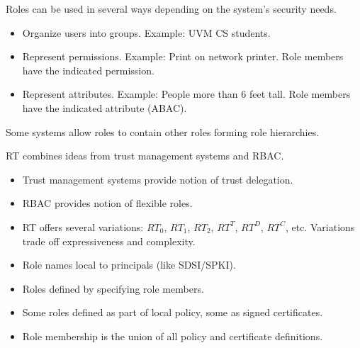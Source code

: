 \documentclass[landscape]{slides}
\begin{document}
\stopslide



Roles can be used in several ways depending on the system's security needs.

\begin{itemize}

\item Organize users into groups. Example: UVM CS students.

\item Represent permissions. Example: Print on network printer. Role members have the indicated permission.

\item Represent attributes. Example: People more than 6 feet tall. Role members have the indicated attribute (ABAC).

\end{itemize}

Some systems allow roles to contain other roles forming role hierarchies.

\stopslide



RT combines ideas from trust management systems and RBAC.

\begin{itemize}

\item Trust management systems provide notion of trust delegation.

\item RBAC provides notion of flexible roles.

\item RT offers several variations: $RT_0$, $RT_1$, $RT_2$, $RT^T$, $RT^D$, $RT^C$, etc.  Variations trade off expressiveness and complexity.

\end{itemize}

\stopslide



\begin{itemize}
\item Role names local to principals (like SDSI/SPKI).
\item Roles defined by specifying role members.
\item Some roles defined as part of local policy, some as signed certificates.
\item Role membership is the union of all policy and certificate definitions.
\end{itemize}
\end{document}

